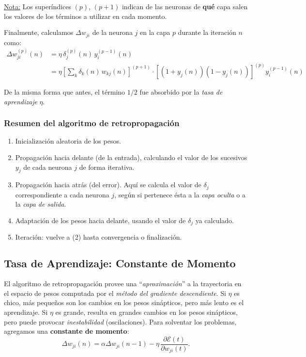 \documentclass[10pt,a4paper]{article}
\begin{document}
\underline{Nota:} Los superíndices $(p)$, $(p+1)$ indican de las neuronas de \textbf{qué} capa salen los valores de los términos a utilizar en cada momento.

Finalmente, calculamos $\Delta w_{ji}$ de la neurona $j$ en la capa $p$ durante la iteración $n$ como:
\begin{align*}
\Delta w_{ji}^{(p)} (n)
&= \eta \, \delta_j^{(p)}(n)\, y_i^{(p-1)}(n) \\
&=
\eta
\left[\sum_k \delta_k(n) \, w_{kj}(n)\right]^{(p+1)} \cdot
\left[(1+y_j(n))(1-y_j(n))\right]^{(p)} 
y_i^{(p-1)}(n)
\end{align*}

De la misma forma que antes, el término $1/2$ fue absorbido por la \textit{tasa de aprendizaje} $\eta$.

\subsubsection{Resumen del algoritmo de retropropagación}

\begin{enumerate}
\item Inicialización aleatoria de los pesos.
\item Propagación hacia delante (de la entrada), calculando el valor de los sucesivos $y_j$ de cada neurona $j$ de forma iterativa.
\item Propagación hacia atrás (del error). Aquí se calcula el valor de $\delta_j$ correspondiente a cada neurona $j$, según si pertenece ésta a la \textit{capa oculta} o a la \textit{capa de salida}.
\item Adaptación de los pesos hacia delante, usando el valor de $\delta_j$ ya calculado.
\item Iteración: vuelve a (2) hasta convergencia o finalización.
\end{enumerate}

\subsection{Tasa de Aprendizaje: Constante de Momento}

El algoritmo de retropropagación provee una ``\textit{aproximación}'' a la trayectoria en el espacio de pesos computada por el \textit{método del gradiente descendiente}. Si $\eta$ es chico, más pequeños son los cambios en los pesos sinápticos, pero más lento es el aprendizaje. Si $\eta$ es grande, resulta en grandes cambios en los pesos sinápticos, pero puede provocar \textit{inestabilidad} (oscilaciones). Para solventar los problemas, agregamos una \textbf{constante de momento}:
\[\Delta w_{ji}(n)=\alpha \Delta w_{ji}(n-1)-\eta \,\frac{\partial \mathcal{E} (t)}{\partial w_{ji}(t)}.\]
\end{document}
